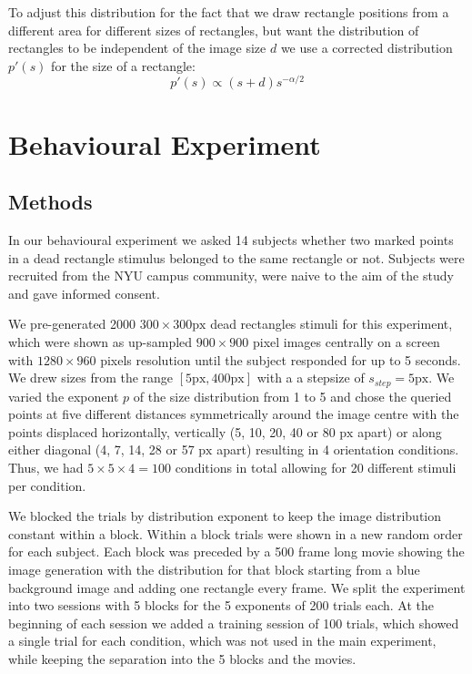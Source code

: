 \documentclass[10pt,letterpaper]{article}
\begin{document}
To adjust this distribution for the fact that we draw rectangle positions from a different area for different sizes of rectangles, but want the distribution of rectangles to be independent of the image size $d$ we use a corrected distribution $p'(s)$ for the size of a rectangle:
\begin{equation}
    p'(s) \propto (s+d) s^{-\alpha/2}
\end{equation}{}

\section{Behavioural Experiment}
\subsection{Methods}
In our behavioural experiment we asked 14 subjects whether two marked points in a dead rectangle stimulus belonged to the same rectangle or not. Subjects were recruited from the NYU campus community, were naive to the aim of the study and gave informed consent.

We pre-generated 2000 $300\times300 \mathrm{px}$ dead rectangles stimuli for this experiment, which were shown as up-sampled $900\times900$ pixel images centrally on a screen with $1280\times960$ pixels resolution until the subject responded for up to 5 seconds. We drew sizes from the range $[5\mathrm{px},400\mathrm{px}]$ with a a stepsize of $s_{step}=5\mathrm{px}$. We varied the exponent $p$ of the size distribution from 1 to 5 and chose the queried points at five different distances symmetrically around the image centre with the points displaced horizontally, vertically (5, 10, 20, 40 or 80 $\mathrm{px}$ apart) or along either diagonal (4, 7, 14, 28 or 57 $\mathrm{px}$ apart) resulting in 4 orientation conditions. Thus, we had $5\times5\times4=100$ conditions in total allowing for 20 different stimuli per condition.

We blocked the trials by distribution exponent to keep the image distribution constant within a block. Within a block trials were shown in a new random order for each subject. Each block was preceded by a 500 frame long movie showing the image generation with the distribution for that block starting from a blue background image and adding one rectangle every frame. We split the experiment into two sessions with 5 blocks for the 5 exponents of 200 trials each. At the beginning of each session we added a training session of 100 trials, which showed a single trial for each condition, which was not used in the main experiment, while keeping the separation into the 5 blocks and the movies.
\end{document}
